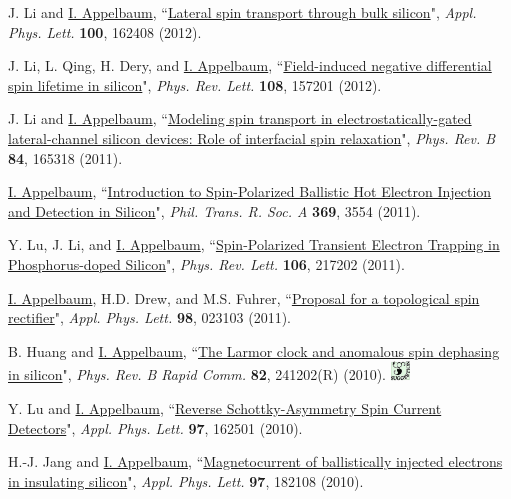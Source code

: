 \documentclass[paper=letter,fontsize=11pt]{scrartcl} %
\newcommand{\PaperEntry}[7]{
		\noindent #1, ``\href{#7}{#2}", \textit{#3} \textbf{#4}, #5 (#6).}
\begin{document}
\begin{etaremune}
\item\PaperEntry{J. Li and \underline{I. Appelbaum}}{Lateral spin transport through bulk silicon}{Appl. Phys. Lett.}{100}{162408}{2012}{http://dx.doi.org/10.1063/1.4704802}

\item\PaperEntry{J. Li, L. Qing, H. Dery, and \underline{I. Appelbaum}}{Field-induced negative differential spin lifetime in silicon}{Phys. Rev. Lett.}{108}{157201}{2012}{http://dx.doi.org/10.1103/PhysRevLett.108.157201}

\item\PaperEntry{J. Li and \underline{I. Appelbaum}}{Modeling spin transport in electrostatically-gated lateral-channel silicon devices: Role of interfacial spin relaxation}{Phys. Rev. B}{84}{165318}{2011}{http://dx.doi.org/10.1103/PhysRevB.84.165318}

\item\PaperEntry{\underline{I. Appelbaum}}{Introduction to Spin-Polarized Ballistic Hot Electron Injection and Detection in Silicon}{Phil. Trans. R. Soc. A}{369}{3554}{2011}{http://dx.doi.org/10.1098/rsta.2011.0137}

\item\PaperEntry{Y. Lu, J. Li, and \underline{I. Appelbaum}}{Spin-Polarized Transient Electron Trapping in Phosphorus-doped Silicon}{Phys. Rev. Lett.}{106}{217202}{2011}{http://dx.doi.org/10.1103/PhysRevLett.106.217202}

\item\PaperEntry{\underline{I. Appelbaum}, H.D. Drew, and M.S. Fuhrer}{Proposal for a topological spin rectifier}{Appl. Phys. Lett.}{98}{023103}{2011}{http://dx.doi.org/10.1063/1.3541545}

\item\PaperEntry{B. Huang and \underline{I. Appelbaum}}{The Larmor clock and anomalous spin dephasing in silicon}{Phys. Rev. B Rapid Comm.}{82}{241202(R)}{2010}{http://dx.doi.org/10.1103/PhysRevB.82.241202} \includegraphics[width=0.2in]{sug.pdf} 

\item\PaperEntry{Y. Lu and \underline{I. Appelbaum}}{Reverse Schottky-Asymmetry Spin Current Detectors}{Appl. Phys. Lett.}{97}{162501}{2010}{http://dx.doi.org/10.1063/1.3504659}

\item\PaperEntry{H.-J. Jang and \underline{I. Appelbaum}}{Magnetocurrent of ballistically injected electrons in insulating silicon}{Appl. Phys. Lett.}{97}{182108}{2010}{http://dx.doi.org/10.1063/1.3511681}


\end{etaremune}
\end{document}
